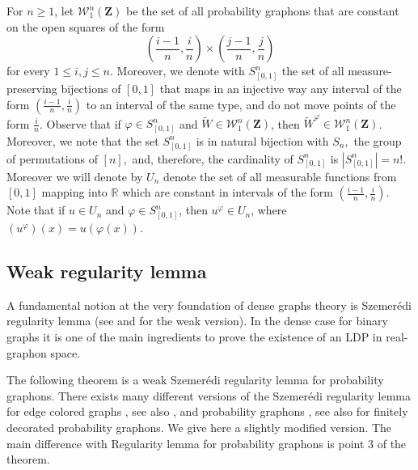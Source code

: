 \documentclass[12pt,twoside,a4paper]{article}
\newcommand{\cW}{{\mathcal W}}  %
\newcommand{\Space}{\mathbf{Z}}
\begin{document}
For $n \geq 1$, let $\cW^n_{1}(\Space)$ be the set of all probability graphons that are constant on the open squares of the form
\[
\left( \frac{i-1}{n}, \frac{i}{n} \right) \times \left( \frac{j-1}{n}, \frac{j}{n} \right)
\]
for every $1 \leq i,j \leq n$. Moreover, we denote with $S^n_{[0,1]}$ the set of all measure-preserving bijections of $[0,1]$
that maps in an injective way any interval of the form $\left(\frac{i-1}{n}, \frac{i}{n}\right)$ to an interval of
the same type, and do not move points of the form $\frac{i}{n}$. Observe that if $\varphi \in S^n_{[0,1]}$ and
$\widetilde{W} \in \cW^n_{1}(\Space)$, then $\widetilde{W}^{\varphi} \in \cW^n_{1}(\Space)$. Moreover, we note that the set $S^n_{[0,1]}$ is in natural bijection with $S_n,$ the
group of permutations of $[n],$ and, therefore, the cardinality of $S^n_{[0,1]}$ is  $|S^n_{[0,1]}| = n!$. Moreover we will denote by $U_n$ denote the set of all measurable functions from $[0,1]$ mapping into $\mathbb{R}$ which are constant in intervals of the form $\left(\frac{i-1}{n}, \frac{i}{n}\right)$. Note that if $u \in U_n$ and $\varphi \in S^n_{[0,1]}$, then $u^{\varphi} \in U_n$, where $(u^\varphi)(x) = u(\varphi(x))$. 

\subsection{Weak regularity lemma }\label{sec:reglemma}
A fundamental notion at the very foundation of dense graphs theory is Szemerédi regularity lemma (see \cite{szemeredi1975regular} and \cite{frieze1999quick} for the weak version). In the dense case for binary graphs it is one of the main ingredients to prove the existence of an LDP in real-graphon space.




The following theorem is a weak Szemerédi regularity lemma for probability graphons. There exists many different versions of the Szemerédi regularity lemma for edge colored graphs \cite[Theorem 1.18]{komlos1995szemeredi}, see also \cite{axenovich2011Szemeredi_version, robert_spectral_szemeredi}, and probability graphons \cite[Corollary 4.14]{abraham2023probabilitygraphons}, see also \cite[Lemma 7.5]{falgasravry2016multicolour} for finitely decorated probability graphons. We give here a slightly modified version. The main difference with Regularity lemma for probability graphons \cite[Corollary 4.14]{abraham2023probabilitygraphons} is point 3 of the theorem.  
\end{document}
